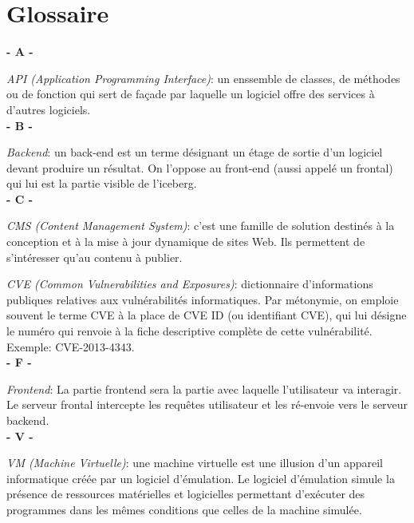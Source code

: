 \section{Glossaire}
\noindent

\vskip 0.1cm
\textbf{- A -}\\
\vskip 0.1cm

\textit{API (Application Programming Interface)}: un enssemble de classes, de méthodes ou de fonction qui sert de façade par laquelle un logiciel offre des services à d'autres logiciels.\\

\vskip 0.1cm
\textbf{- B -}\\
\vskip 0.1cm

\textit{Backend}: un back-end est un terme désignant un étage de sortie d'un logiciel devant produire un résultat. On l'oppose au front-end (aussi appelé un frontal) qui lui est la partie visible de l'iceberg.\\

\vskip 0.1cm
\textbf{- C -}\\
\vskip 0.1cm

\textit{CMS (Content Management System)}: c'est une famille de solution destinés à la conception et à la mise à jour dynamique de sites Web. Ils permettent de s'intéresser qu'au contenu à publier.

\textit{CVE (Common Vulnerabilities and Exposures)}: dictionnaire d'informations publiques relatives aux vulnérabilités informatiques. Par métonymie, on emploie souvent le terme CVE à la place de CVE ID (ou identifiant CVE), qui lui désigne le numéro qui renvoie à la fiche descriptive complète de cette vulnérabilité. Exemple: CVE-2013-4343.\\

\vskip 0.1cm
\textbf{- F -}\\
\vskip 0.1cm

\textit{Frontend}: La partie frontend sera la partie avec laquelle l'utilisateur va interagir. Le serveur frontal intercepte les requêtes utilisateur et les ré-envoie vers le serveur backend. \\

\vskip 0.1cm
\textbf{- V -}\\
\vskip 0.1cm

\textit{VM (Machine Virtuelle)}: une machine virtuelle est une illusion d'un appareil informatique créée par un logiciel d'émulation. Le logiciel d'émulation simule la présence de ressources matérielles et logicielles permettant d'exécuter des programmes dans les mêmes conditions que celles de la machine simulée.\\

